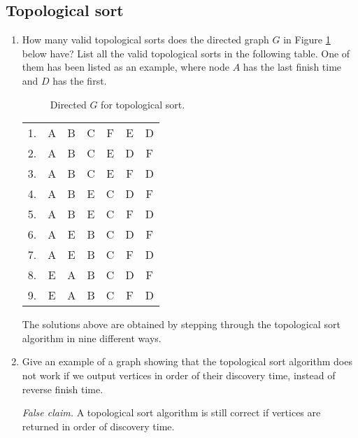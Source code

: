 \subsection{Topological sort}
\begin{enumerate}
    \item How many valid topological sorts does the directed graph $G$ in Figure \ref{fig:topo-sort} below have? List all the valid topological sorts in the following table. One of them has been listed as an example, where node $A$ has the last finish time and $D$ has the first.

    \begin{figure}[H]
        \centering
        \caption{Directed $G$ for topological sort.}
        \label{fig:topo-sort}
    \end{figure}
    
     \begin{center}
    \begin{tabular}{c c c c c c c}
    \hline
     1. & A & B & C & F & E & D\\
     2. & A & B & C & E & D & F\\
     3. & A & B & C & E & F & D\\
     4. & A & B & E & C & D & F\\
     5. & A & B & E & C & F & D\\
     6. & A & E & B & C & D & F\\
     7. & A & E & B & C & F & D\\
     8. & E & A & B & C & D & F\\
     9. & E & A & B & C & F & D\\
    \hline
    \end{tabular}
    \label{table:q3}
    \end{center}
\begin{solution}
The solutions above are obtained by stepping through the topological sort algorithm in nine different ways.
\end{solution}
\item 
Give an example of a graph showing that the topological sort algorithm does not work if we output vertices in order of their discovery time, instead of reverse finish time.
\begin{solution}
\textit{False claim. }A topological sort algorithm is still correct if vertices are returned in order of discovery time.


\end{solution}
\end{enumerate}
